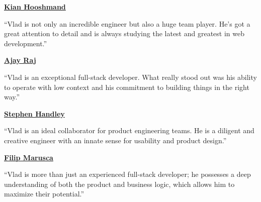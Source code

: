 
{\fontsize{9}{12}\selectfont\bfseries\color{heading}\href{https://www.linkedin.com/in/kianhooshmand/}{Kian Hooshmand}}
\hspace{3pt}\par\nointerlineskip\vspace{\sidebarsubheadingsep}%
{\bodytext ``Vlad is not only an incredible engineer but also a huge team player. He's got a great attention to detail and is always studying the latest and greatest in web development.''\par}

\vspace{\sidebarsubsectionsep}
{\fontsize{9}{12}\selectfont\bfseries\color{heading}\href{https://www.linkedin.com/in/ajaynraj/}{Ajay Raj}}
\hspace{3pt}\par\nointerlineskip\vspace{\sidebarsubheadingsep}%
{\bodytext ``Vlad is an exceptional full-stack developer. What really stood out was his ability to operate with low context and his commitment to building things in the right way.''\par}

\vspace{\sidebarsubsectionsep}
{\fontsize{9}{12}\selectfont\bfseries\color{heading}\href{https://www.linkedin.com/in/stephenhandley/}{Stephen Handley}}
\hspace{3pt}\par\nointerlineskip\vspace{\sidebarsubheadingsep}%
{\bodytext ``Vlad is an ideal collaborator for product engineering teams. He is a diligent and creative engineer with an innate sense for usability and product design.''\par}

\vspace{\sidebarsubsectionsep}
{\fontsize{9}{12}\selectfont\bfseries\color{heading}\href{https://www.linkedin.com/in/filipmarusca/}{Filip Marusca}}
\hspace{3pt}\par\nointerlineskip\vspace{\sidebarsubheadingsep}%
{\bodytext ``Vlad is more than just an experienced full-stack developer; he possesses a deep understanding of both the product and business logic, which allows him to maximize their potential.''\par}
